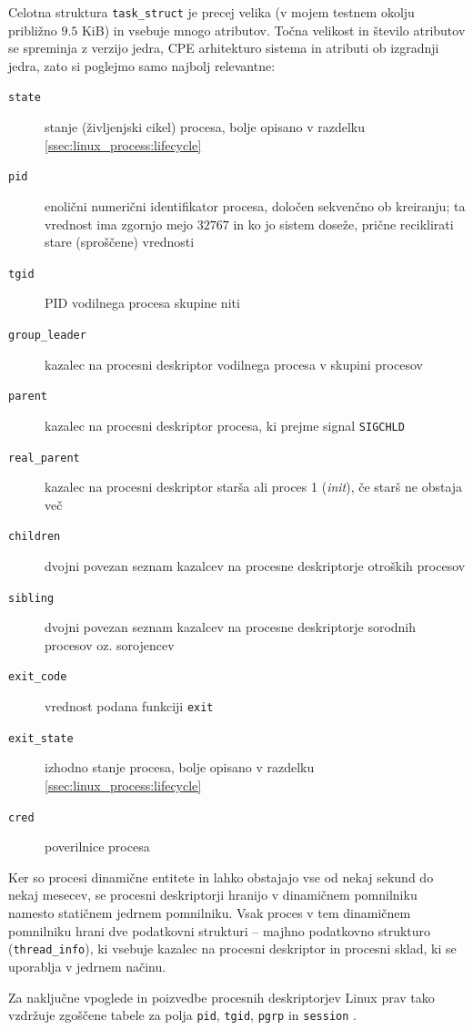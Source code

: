 \documentclass[a4paper,12pt,openright]{book}
\begin{document}
Celotna struktura \texttt{task\_struct} je precej velika (v mojem testnem okolju približno $9.5$ KiB) in vsebuje mnogo atributov.
Točna velikost in število atributov se spreminja z verzijo jedra, CPE arhitekturo sistema in atributi ob izgradnji jedra, zato si poglejmo samo najbolj relevantne:
\begin{description}
	\item[\texttt{state}] stanje (življenjski cikel) procesa, bolje opisano v razdelku \ref{ssec:linux_process:lifecycle}
	\item[\texttt{pid}] enolični numerični identifikator procesa, določen sekvenčno ob kreiranju; ta vrednost ima zgornjo mejo $32767$ in ko jo sistem doseže, prične reciklirati stare (sproščene) vrednosti
	\item[\texttt{tgid}] PID vodilnega procesa skupine niti
	\item[\texttt{group\_leader}] kazalec na procesni deskriptor vodilnega procesa v skupini procesov
	\item[\texttt{parent}] kazalec na procesni deskriptor procesa, ki prejme signal \texttt{SIGCHLD}
	\item[\texttt{real\_parent}] kazalec na procesni deskriptor starša ali proces 1 (\textit{init}), če starš ne obstaja več
	\item[\texttt{children}] dvojni povezan seznam kazalcev na procesne deskriptorje otroških procesov
	\item[\texttt{sibling}] dvojni povezan seznam kazalcev na procesne deskriptorje sorodnih procesov oz. sorojencev
	\item[\texttt{exit\_code}] vrednost podana funkciji \texttt{exit}
	\item[\texttt{exit\_state}] izhodno stanje procesa, bolje opisano v razdelku \ref{ssec:linux_process:lifecycle}
	\item[\texttt{cred}] poverilnice procesa
\end{description}

Ker so procesi dinamične entitete in lahko obstajajo vse od nekaj sekund do nekaj mesecev, se procesni deskriptorji hranijo v dinamičnem pomnilniku namesto statičnem jedrnem pomnilniku.
Vsak proces v tem dinamičnem pomnilniku hrani dve podatkovni strukturi -- majhno podatkovno strukturo (\texttt{thread\_info}), ki vsebuje kazalec na procesni deskriptor in procesni sklad, ki se uporablja v jedrnem načinu.

Za naključne vpoglede in poizvedbe procesnih deskriptorjev Linux prav tako vzdržuje zgoščene tabele za polja \texttt{pid}, \texttt{tgid}, \texttt{pgrp} in \texttt{session} \cite{Bovet_Cesati_2005}.
\end{document}
